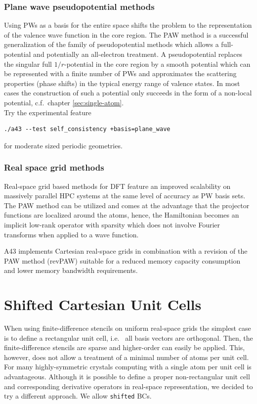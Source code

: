 \documentclass[oribibl]{llncs}
\newcommand{\ttt}[1]{\texttt{#1}}
\newcommand{\codename}{A43}
\begin{document}
\subsubsection*{Plane wave pseudopotential methods}
Using \ac{PW}s as a basis for the entire space shifts the problem to the representation of the valence wave function in the core region.
The \ac{PAW} method is a successful generalization of the family of pseudopotential methods which allows a full-potential and potentially an all-electron treatment.
A pseudopotential replaces the singular full $1/r$-potential in the core region
by a smooth potential which can be represented with a finite number of \ac{PW}s
and approximates the scattering properties (phase shifts) in the typical energy
range of valence states.
In most cases the construction of such a potential only succeeds in the form of a non-local potential, c.f.~chapter \ref{sec:single-atom}.
\\
Try the experimental feature
\begin{verbatim}
./a43 --test self_consistency +basis=plane_wave
\end{verbatim}
for moderate sized periodic geometries.

\subsubsection*{Real space grid methods}
Real-space grid based methods for \ac{DFT}
feature an improved scalability on massively parallel \ac{HPC} systems at the same level of accuracy as \ac{PW} basis sets. 
The \ac{PAW} method can be utilized and comes at the advantage that the projector functions are localized around the atoms, 
hence, the Hamiltonian becomes an implicit low-rank operator with sparsity which does not involve Fourier transforms when applied to a wave function.

\codename{} implements Cartesian real-space grids 
in combination with a revision of the \ac{PAW} method (revPAW) suitable for
a reduced memory capacity consumption and lower memory bandwidth requirements.





\section{Shifted Cartesian Unit Cells} \label{sec:shifted-BC}

When using finite-difference stencils on uniform real-space grids
the simplest case is to define a rectangular unit cell,
i.e.~ all basis vectors are orthogonal.
Then, the finite-difference stencils are sparse and higher-order can easily be applied.
This, however, does not allow a treatment of a minimal number of atoms per unit cell.
For many highly-symmetric crystals computing with a single atom per unit cell is advantageous.
Although it is possible to define a proper non-rectangular unit cell and corresponding
derivative operators in real-space representation, we decided to try a different approach.
We allow \ttt{shifted} \ac{BC}s.
\end{document}
